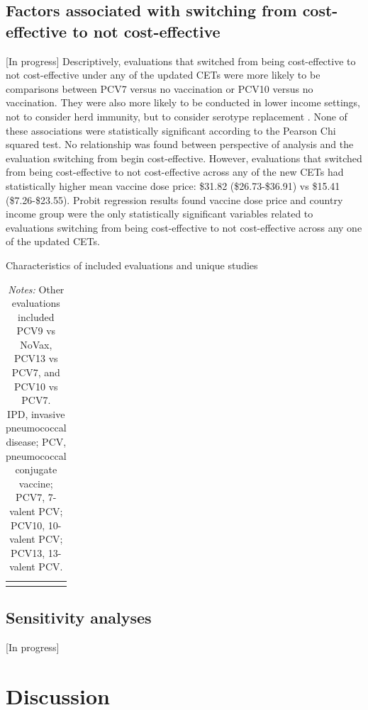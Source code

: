 \documentclass[12pt]{article}
\begin{document}
\subsection{Factors associated with switching from cost-effective to not cost-effective}
[In progress]
Descriptively, evaluations that switched from being cost-effective to not cost-effective under any of the updated CETs were more likely to be comparisons between PCV7 versus no vaccination or PCV10 versus no vaccination. They were also more likely to be conducted in lower income settings, not to consider herd immunity, but to consider serotype replacement . None of these associations were statistically significant according to the Pearson Chi squared test. No relationship was found between perspective of analysis and the evaluation switching from begin cost-effective. However, evaluations that switched from being cost-effective to not cost-effective across any of the new CETs had statistically higher mean vaccine dose price: \$31.82 (\$26.73-\$36.91) vs \$15.41 (\$7.26-\$23.55).  Probit regression results found vaccine dose price and country income group were the only statistically significant variables related to evaluations switching from being cost-effective to not cost-effective across any one of the updated CETs.




\begin{table}[H]
    \centering \singlespacing \small
    \caption{Characteristics of included evaluations and unique studies}
    \begin{tabular}{|L{4.5cm}|L{4cm}|C{2.75cm}|C{2.75cm}|}
        \hline
    \end{tabular}
    \label{tab_likely_anyswitch}
    \caption*{\footnotesize \textit{Notes:} Other evaluations included PCV9 vs NoVax, PCV13 vs PCV7, and PCV10 vs PCV7. \\
    IPD, invasive pneumococcal disease; PCV, pneumococcal conjugate vaccine; PCV7, 7-valent PCV; PCV10, 10-valent PCV; PCV13, 13-valent PCV. 
}
\end{table}


\subsection{Sensitivity analyses}
[In progress]


\section{Discussion}
\end{document}
